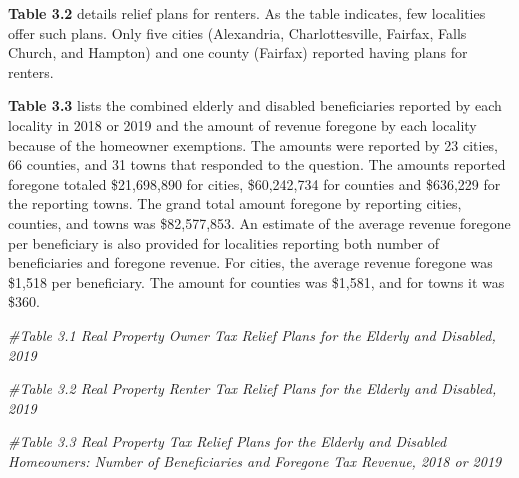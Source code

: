 \documentclass[
]{book}
\newenvironment{Shaded}{\begin{snugshade}}{\end{snugshade}}
\newcommand{\CommentTok}[1]{\textcolor[rgb]{0.56,0.35,0.01}{\textit{#1}}}
\begin{document}
\textbf{Table 3.2} details relief plans for renters. As the table indicates, few localities offer such plans. Only five cities
(Alexandria, Charlottesville, Fairfax, Falls Church, and Hampton) and one county (Fairfax) reported having plans
for renters.

\textbf{Table 3.3} lists the combined elderly and disabled beneficiaries reported by each locality in 2018 or 2019 and
the amount of revenue foregone by each locality because of the homeowner exemptions. The amounts were reported
by 23 cities, 66 counties, and 31 towns that responded to the question. The amounts reported foregone totaled \$21,698,890
for cities, \$60,242,734 for counties and \$636,229 for the reporting towns. The grand total amount foregone by
reporting cities, counties, and towns was \$82,577,853. An estimate of the average revenue foregone per beneficiary
is also provided for localities reporting both number of beneficiaries and foregone revenue. For cities, the average
revenue foregone was \$1,518 per beneficiary. The amount for counties was \$1,581, and for towns it was \$360.

\begin{Shaded}
\begin{Highlighting}[]
\CommentTok{\#Table 3.1 Real Property Owner Tax Relief Plans for the Elderly and Disabled, 2019}

\CommentTok{\#Table 3.2 Real Property Renter Tax Relief Plans for the Elderly and Disabled, 2019}

\CommentTok{\#Table 3.3 Real Property Tax Relief Plans for the Elderly and Disabled Homeowners: Number of Beneficiaries and Foregone Tax Revenue, 2018 or 2019}
\end{Highlighting}
\end{Shaded}


  
\end{document}
